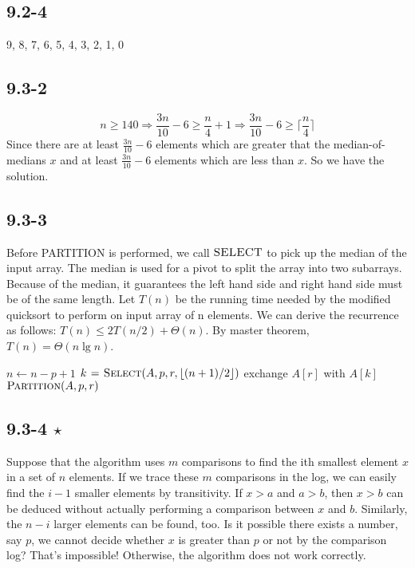\documentclass{book}
\begin{document}
\begin{CJK}{UTF8}{gkai}
\subsection*{9.2-4} 9, 8, 7, 6, 5, 4, 3, 2, 1, 0

\subsection*{9.3-2}
$$n \ge 140 \Rightarrow \frac{3n}{10} -6 \ge \frac{n}{4}+1 \Rightarrow 
\frac{3n}{10}-6 \ge \lceil\frac{n}{4}\rceil$$
Since there are at least $\frac{3n}{10}-6$ elements which are greater that the 
median-of-medians $x$ and at least $\frac{3n}{10}-6$ elements which are less 
than $x$. So we have the solution.

\subsection*{9.3-3}
Before PARTITION is performed, we call $\textnormal{\scshape SELECT}$ to pick up the median of 
the input array. The median is used for a pivot to split the array into two 
subarrays.  Because of the median, it guarantees the left hand side and right 
hand side must be of the same length. Let $T(n)$ be the running time needed by 
the modified quicksort to perform on input array of n elements. We can derive 
the recurrence as follows: $T(n) \leq 2T(n/2) + \Theta(n)$. By master theorem, 
$T(n) = \Theta(n\lg n)$.

\begin{codebox}
\li $n \gets n-p+1$
\li $k \mathrel{\hspace{1pt}=\hspace{1pt}} \textnormal{\scshape Select}(A,p,r,\lfloor(n+1)/2\rfloor)$
\li exchange $A[r]$ with $A[k]$
\li \Return $\textnormal{\scshape Partition}(A,p,r)$
\end{codebox}

\subsection*{9.3-4 $\star$}
Suppose that the algorithm uses $m$ comparisons to find the ith smallest element 
$x$ in a set of $n$ elements. If we trace these $m$ comparisons in the log, we 
can easily find the $i-1$ smaller elements by transitivity. If $x > a$ and $a > 
b$, then $x > b$ can be deduced without actually performing a comparison between 
$x$ and $b$.  Similarly, the $n-i$ larger elements can be found, too. Is it 
possible there exists a number, say $p$, we cannot decide whether $x$ is greater 
than $p$ or not by the comparison log? That's impossible! Otherwise, the 
algorithm does not work correctly.


\end{CJK}
\end{document}
